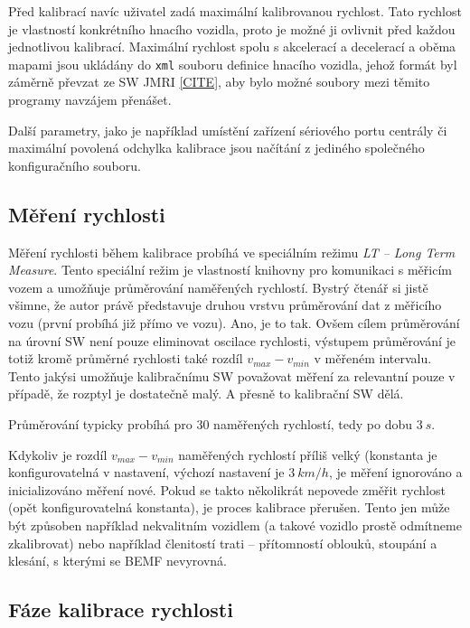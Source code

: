 Před kalibrací navíc uživatel zadá maximální kalibrovanou rychlost. Tato rychlost
je vlastností konkrétního hnacího vozidla, proto je možné ji ovlivnit před
každou jednotlivou kalibrací. Maximální rychlost spolu s akcelerací a decelerací
a oběma mapami jsou ukládány do \texttt{xml} souboru definice hnacího vozidla,
jehož formát byl záměrně převzat ze SW JMRI \ref{CITE}, aby bylo možné soubory
mezi těmito programy navzájem přenášet.

Další parametry, jako je například umístění zařízení sériového portu centrály
či maximální povolená odchylka kalibrace jsou načítání z jediného společného
konfiguračního souboru.

\subsection{Měření rychlosti}
\label{sec:ac:lt-measure}

Měření rychlosti během kalibrace probíhá ve speciálním režimu \textit{LT --
Long Term Measure}. Tento speciální režim je vlastností knihovny pro komunikaci
s měřicím vozem a umožňuje průměrování naměřených rychlostí. Bystrý čtenář si
jistě všimne, že autor právě představuje druhou vrstvu průměrování dat z
měřicího vozu (první probíhá již přímo ve vozu). Ano, je to tak. Ovšem cílem
průměrování na úrovní SW není pouze eliminovat oscilace rychlosti, výstupem
průměrování je totiž kromě průměrné rychlosti také rozdíl $v_{max} - v_{min}$ v
měřeném intervalu. Tento jakýsi  umožňuje kalibračnímu SW
považovat měření za relevantní pouze v případě, že rozptyl je dostatečně malý.
A přesně to kalibrační SW dělá.

Průměrování typicky probíhá pro $30$ naměřených rychlostí, tedy po dobu $3\ s$.

Kdykoliv je rozdíl $v_{max} - v_{min}$ naměřených rychlostí příliš velký
(konstanta je konfigurovatelná v nastavení, výchozí nastavení je $3\ km/h$, je
měření ignorováno a inicializováno měření nové. Pokud se takto několikrát
nepovede změřit rychlost (opět konfigurovatelná konstanta), je proces kalibrace
přerušen. Tento jen může být způsoben například nekvalitním vozidlem (a takové
vozidlo prostě odmítneme zkalibrovat) nebo například členitostí trati --
přítomností oblouků, stoupání a klesání, s kterými se BEMF nevyrovná.

\subsection{Fáze kalibrace rychlosti}

